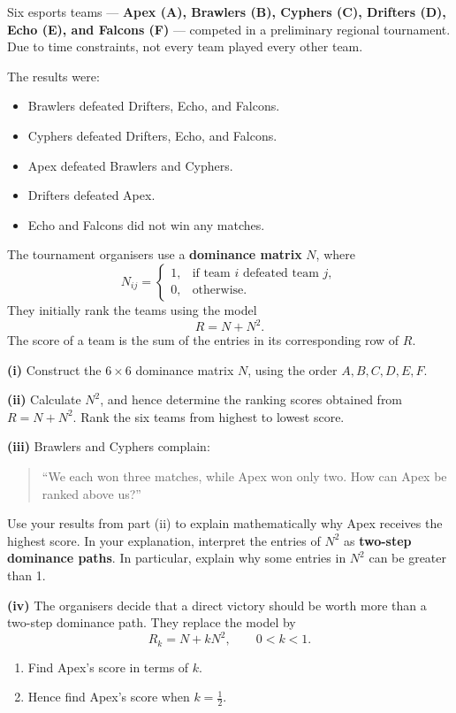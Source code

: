 \begin{problem}
Six esports teams --- \textbf{Apex (A), Brawlers (B), Cyphers (C), Drifters (D), Echo (E), and Falcons (F)} --- competed in a preliminary regional tournament. Due to time constraints, not every team played every other team.

The results were:
\begin{itemize}
    \item Brawlers defeated Drifters, Echo, and Falcons.
    \item Cyphers defeated Drifters, Echo, and Falcons.
    \item Apex defeated Brawlers and Cyphers.
    \item Drifters defeated Apex.
    \item Echo and Falcons did not win any matches.
\end{itemize}

The tournament organisers use a \textbf{dominance matrix} $N$, where
\[ N_{ij}= \begin{cases} 1,&\text{if team }i\text{ defeated team }j,\\ 0,&\text{otherwise.} \end{cases} \]
They initially rank the teams using the model
\[ R=N+N^2. \]
The score of a team is the sum of the entries in its corresponding row of $R$.

\textbf{(i)} Construct the $6\times 6$ dominance matrix $N$, using the order $A, B, C, D, E, F$.

\textbf{(ii)} Calculate $N^2$, and hence determine the ranking scores obtained from $R=N+N^2$. Rank the six teams from highest to lowest score.

\textbf{(iii)} Brawlers and Cyphers complain:
\begin{quote}
``We each won three matches, while Apex won only two. How can Apex be ranked above us?''
\end{quote}
Use your results from part (ii) to explain mathematically why Apex receives the highest score. In your explanation, interpret the entries of $N^2$ as \textbf{two-step dominance paths}. In particular, explain why some entries in $N^2$ can be greater than 1.

\textbf{(iv)} The organisers decide that a direct victory should be worth more than a two-step dominance path. They replace the model by
\[ R_k=N+kN^2, \qquad 0<k<1. \]
\begin{enumerate}
    \item Find Apex's score in terms of $k$.
    \item Hence find Apex's score when $k=\frac12$.
\end{enumerate}
\end{problem}

